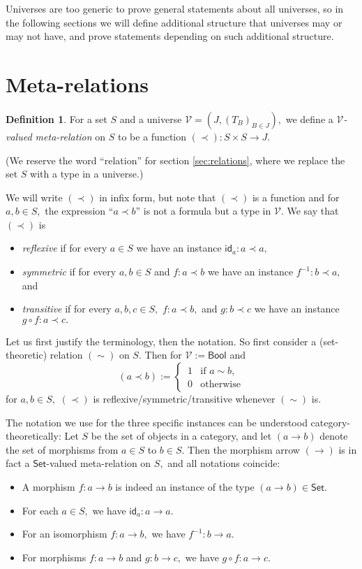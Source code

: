 \documentclass[a4paper]{article}
\theoremstyle{definition}
\newtheorem{definition}{Definition}[section]
\theoremstyle{remark}
\newcommand{\defn}{\emph}
\newcommand{\V}{\mathcal{V}}
\newcommand{\nm}{\mathsf}
\newcommand{\universe}{\nm}
\newcommand{\Bool}{\universe{Bool}}
\newcommand{\Set}{\universe{Set}}
\newcommand{\id}{\nm{id}}
\begin{document}
Universes are too generic to prove general statements about all universes, so in the following sections
we will define additional structure that universes may or may not have, and prove statements depending
on such additional structure.

\section{Meta-relations}
\label{sec:meta-relations}

\begin{definition}
  For a set $S$ and a universe $\V = (J, (T_B)_{B \in J}),$ we define a \defn{$\V$-valued meta-relation}
  on $S$ to be a function $(\prec) : S \times S \to J.$
\end{definition}

(We reserve the word ``relation'' for section \ref{sec:relations}, where we replace the set $S$ with a type
in a universe.)

We will write $(\prec)$ in infix form, but note that $(\prec)$ is a function and for $a,b \in S,$ the
expression ``$a \prec b$'' is not a formula but a type in $\V.$
We say that $(\prec)$ is
\begin{itemize}
  \item \defn{reflexive} if for every $a \in S$ we have an instance $\id_a : a \prec a,$
  \item \defn{symmetric} if for every $a,b \in S$ and $f : a \prec b$ we have an instance
  $f^{-1} : b \prec a,$ and
  \item \defn{transitive} if for every $a,b,c \in S,$ $f : a \prec b,$ and $g : b \prec c$ we have an
  instance $g \circ f : a \prec c.$
\end{itemize}

Let us first justify the terminology, then the notation. So first consider a (set-theoretic) relation
$(\sim)$ on $S.$ Then for $\V := \Bool$ and
\[(a \prec b) := \begin{cases}
  \, 1 & \text{if } a \sim b,\\
  \, 0 & \text{otherwise}
\end{cases}\]
for $a,b \in S,$ $(\prec)$ is reflexive/symmetric/transitive whenever $(\sim)$ is.

The notation we use for the three specific instances can be understood category-theoretically:
Let $S$ be the set of objects in a category, and let $(a \to b)$ denote the set of morphisms
from $a \in S$ to $b \in S.$ Then the morphism arrow $(\to)$ is in fact a $\Set$-valued
meta-relation on $S,$ and all notations coincide:
\begin{itemize}
  \item A morphism $f : a \to b$ is indeed an instance of the type $(a \to b) \in \Set.$
  \item For each $a \in S,$ we have $\id_a : a \to a.$
  \item For an isomorphism $f : a \to b,$ we have $f^{-1} : b \to a.$
  \item For morphisms $f : a \to b$ and $g : b \to c,$ we have $g \circ f : a \to c.$
\end{itemize}
\end{document}
